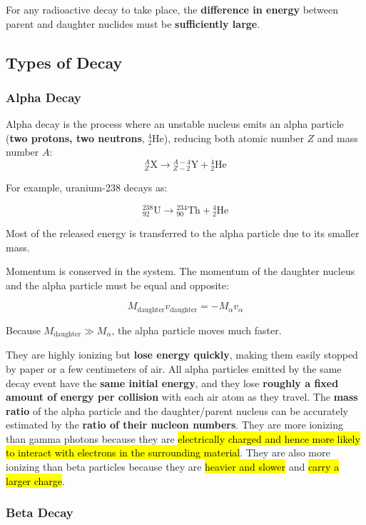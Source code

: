 \documentclass[a4paper,12pt]{article}
\newcommand{\atom}[3]{{}^{#1}_{#2}\text{#3}}
\begin{document}
For any radioactive decay to take place, the \textbf{difference in energy} between parent and daughter nuclides must be \textbf{sufficiently large}.

\pagebreak

\subsection{Types of Decay}

\subsubsection{Alpha Decay}

Alpha decay is the process where an unstable nucleus emits an alpha particle (\textbf{two protons, two neutrons}, $^4_2\text{He}$), reducing both atomic number $Z$ and mass number $A$:
\[
  \atom{A}{Z}{X} \rightarrow \atom{A-4}{Z-2}{Y} + \atom{4}{2}{He}
\]

For example, uranium-238 decays as:

\[
  \atom{238}{92}{U} \rightarrow \atom{234}{90}{Th} + \atom{4}{2}{He}
\]

Most of the released energy is transferred to the alpha particle due to its smaller mass.

Momentum is conserved in the system. The momentum of the daughter nucleus and the alpha particle must be equal and opposite:

\[
  M_{\text{daughter}} v_{\text{daughter}} = - M_{\alpha} v_{\alpha}
\]

Because $M_{\text{daughter}} \gg M_{\alpha}$, the alpha particle moves much faster.

They are highly ionizing but \textbf{lose energy quickly}, making them easily stopped by paper or a few centimeters of air. All alpha particles emitted by the same decay event have the \textbf{same initial energy}, and they lose \textbf{roughly a fixed amount of energy per collision} with each air atom as they travel.
The \textbf{mass ratio} of the alpha particle and the daughter/parent nucleus can be accurately estimated by the \textbf{ratio of their nucleon numbers}.
They are more ionizing than gamma photons because they are \hl{electrically charged and hence more likely to interact with electrons in the surrounding material}. They are also more ionizing than beta particles because they are \hl{heavier and slower} and \hl{carry a larger charge}.

\pagebreak

\subsubsection{Beta Decay}
\end{document}
